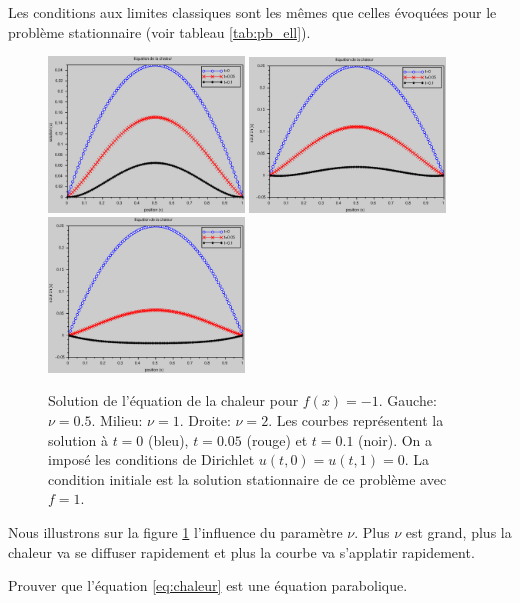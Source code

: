 \documentclass[12pt,a4paper,twoside]{article}
\begin{document}
Les conditions aux limites classiques sont les m\^emes que celles \'evoqu\'ees pour le probl\`eme
stationnaire (voir tableau \ref{tab:pb_ell}).


\begin{figure}[h]
  \centering
  \includegraphics[width = 5.2cm]{Figures/chaleur_nu0_5.eps}
  \includegraphics[width = 5.2cm]{Figures/chaleur_nu1.eps}
  \includegraphics[width = 5.2cm]{Figures/chaleur_nu2.eps}
  \caption{Solution de l'\'equation de la chaleur
  pour $f(x) = -1$. Gauche: $\nu = 0.5$.
  Milieu: $\nu = 1$. Droite: $\nu = 2$.
  Les courbes repr\'esentent la solution \`a $t=0$ (bleu), $t=0.05$ (rouge) et $t=0.1$ (noir).
  On a impos\'e les conditions de Dirichlet $u(t,0) = u(t,1) = 0$.
  La condition initiale est la solution stationnaire de ce probl\`eme avec $f=1$.}
  \label{fig:chaleur_nu}
\end{figure}


Nous illustrons sur la figure \ref{fig:chaleur_nu} l'influence du param\`etre $\nu$.
Plus $\nu$ est grand, plus la chaleur va se diffuser rapidement et plus 
la courbe va s'applatir rapidement.

\begin{exercise}
  Prouver que l'\'equation \eqref{eq:chaleur} est une \'equation parabolique.
\end{exercise}
\end{document}
